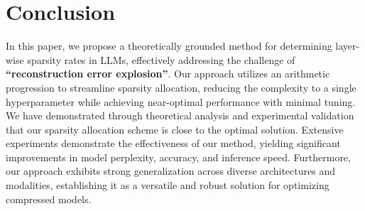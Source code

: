 \section{Conclusion}
In this paper, we propose a theoretically grounded method for determining layer-wise sparsity rates in LLMs, effectively addressing the challenge of \textbf{``reconstruction error explosion''}. Our approach utilizes an arithmetic progression to streamline sparsity allocation, reducing the complexity to a single hyperparameter while achieving near-optimal performance with minimal tuning. We have demonstrated through theoretical analysis and experimental validation that our sparsity allocation scheme is close to the optimal solution. Extensive experiments demonstrate the effectiveness of our method, yielding significant improvements in model perplexity, accuracy, and inference speed. Furthermore, our approach exhibits strong generalization across diverse architectures and modalities, establishing it as a versatile and robust solution for optimizing compressed models. 